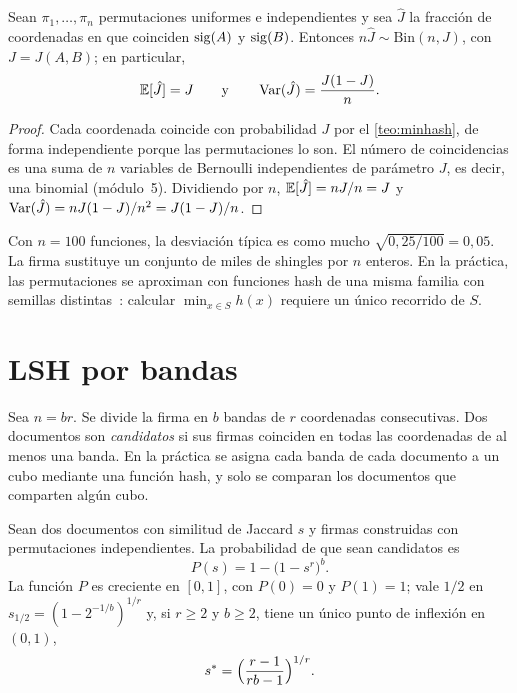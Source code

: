 \begin{corolario}\label{cor:estimador}
Sean $\pi_1,\dots,\pi_n$ permutaciones uniformes e independientes y sea $\hat J$ la fracción de coordenadas en que coinciden $\operatorname{sig}(A)$ y $\operatorname{sig}(B)$. Entonces $n\hat J\sim\mathrm{Bin}(n,J)$, con $J=J(A,B)$; en particular,
\[
\mathbb{E}[\hat J]=J\qquad\text{y}\qquad\operatorname{Var}(\hat J)=\frac{J(1-J)}{n}.
\]
\end{corolario}

\begin{proof}
Cada coordenada coincide con probabilidad $J$ por el \cref{teo:minhash}, de forma independiente porque las permutaciones lo son. El número de coincidencias es una suma de $n$ variables de Bernoulli independientes de parámetro $J$, es decir, una binomial (módulo~5). Dividiendo por $n$, $\mathbb{E}[\hat J]=nJ/n=J$ y $\operatorname{Var}(\hat J)=nJ(1-J)/n^{2}=J(1-J)/n$.
\end{proof}

Con $n=100$ funciones, la desviación típica es como mucho $\sqrt{0{,}25/100}=0{,}05$. La firma sustituye un conjunto de miles de shingles por $n$ enteros. En la práctica, las permutaciones se aproximan con funciones hash de una misma familia con semillas distintas~\cite[§3.2]{cs336a4}: calcular $\min_{x\in S}h(x)$ requiere un único recorrido de $S$.

\section{LSH por bandas}

\begin{definicion}
Sea $n=br$. Se divide la firma en $b$ bandas de $r$ coordenadas consecutivas. Dos documentos son \emph{candidatos} si sus firmas coinciden en todas las coordenadas de al menos una banda. En la práctica se asigna cada banda de cada documento a un cubo mediante una función hash, y solo se comparan los documentos que comparten algún cubo.
\end{definicion}

\begin{proposicion}[Curva en S]\label{prop:curva-s}
Sean dos documentos con similitud de Jaccard $s$ y firmas construidas con permutaciones independientes. La probabilidad de que sean candidatos es
\[
P(s)=1-\bigl(1-s^{r}\bigr)^{b}.
\]
La función $P$ es creciente en $[0,1]$, con $P(0)=0$ y $P(1)=1$; vale $1/2$ en $s_{1/2}=(1-2^{-1/b})^{1/r}$ y, si $r\ge 2$ y $b\ge 2$, tiene un único punto de inflexión en $(0,1)$,
\[
s^{*}=\Bigl(\frac{r-1}{rb-1}\Bigr)^{1/r}.
\]
\end{proposicion}


